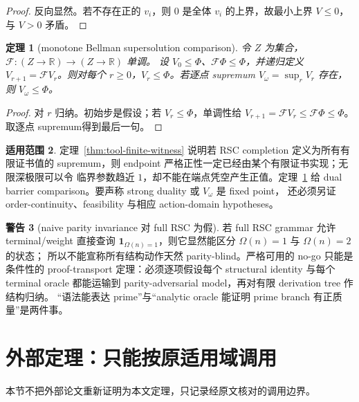 \documentclass[11pt,a4paper]{ctexart}
\newtheorem{theorem}{定理}[section]
\theoremstyle{definition}
\newtheorem{remark}[theorem]{适用范围}
\newtheorem{warning}[theorem]{警告}
\newcommand{\1}{\mathbf 1}
\begin{document}
\begin{proof}
反向显然。若不存在正的 $v_i$，则 $0$ 是全体 $v_i$ 的上界，故最小上界
$V\le0$，与 $V>0$ 矛盾。
\end{proof}

\begin{theorem}[monotone Bellman supersolution comparison]\label{thm:tool-bellman}
令 $Z$ 为集合，$\mathcal F:(Z\to\mathbb R)\to(Z\to\mathbb R)$ 单调。
设 $V_0\le\Phi$、$\mathcal F\Phi\le\Phi$，并递归定义
$V_{r+1}=\mathcal FV_r$。则对每个 $r\ge0$，$V_r\le\Phi$。若逐点 supremum
$V_\omega=\sup_rV_r$ 存在，则 $V_\omega\le\Phi$。
\end{theorem}

\begin{proof}
对 $r$ 归纳。初始步是假设；若 $V_r\le\Phi$，单调性给
$V_{r+1}=\mathcal FV_r\le\mathcal F\Phi\le\Phi$。取逐点 supremum得到最后一句。
\end{proof}

\begin{remark}
定理~\ref{thm:tool-finite-witness} 说明若 RSC completion 定义为所有有限证书值的
supremum，则 endpoint 严格正性一定已经由某个有限证书实现；无限深极限可以令
临界参数趋近 $1$，却不能在端点凭空产生正值。定理~\ref{thm:tool-bellman} 给
dual barrier comparison。要声称 strong duality 或 $V_\omega$ 是 fixed point，
还必须另证 order-continuity、feasibility 与相应 action-domain hypotheses。
\end{remark}

\begin{warning}[naive parity invariance 对 full RSC 为假]
若 full RSC grammar 允许 terminal/weight 直接查询
$\1_{\Omega(n)=1}$，则它显然能区分 $\Omega(n)=1$ 与 $\Omega(n)=2$ 的状态；
所以不能宣称所有结构动作天然 parity-blind。严格可用的 no-go 只能是条件性的
proof-transport 定理：必须逐项假设每个 structural identity 与每个 terminal
oracle 都能运输到 parity-adversarial model，再对有限 derivation tree 作结构归纳。
“语法能表达 prime”与“analytic oracle 能证明 prime branch 有正质量”是两件事。
\end{warning}

\section{外部定理：只能按原适用域调用}

本节不把外部论文重新证明为本文定理，只记录经原文核对的调用边界。
\end{document}
